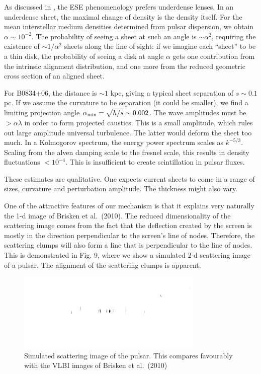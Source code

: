 \documentclass[useAMS,usenatbib]{mn2e}
\begin{document}
As discussed in \cite{2012MNRAS.421L.132P}, the ESE phenomenology
prefers underdense lenses.  In an underdense sheet, the maximal change
of density is the density itself.  For the mean interstellar medium
densities determined from pulsar dispersion, we obtain $\alpha \sim
10^{-2}$.  The probability of seeing a sheet at such an angle is $\sim
\alpha^2$, requiring the existence of $\sim 1/\alpha^2$ sheets along
the line of sight: if we imagine each ``sheet'' to be a thin disk, the
probability of seeing a disk at angle $\alpha$ gets one contribution
from the intrinsic alignment distribution, and one more from the
reduced geometric cross section of an aligned sheet.

For
B0834+06, the distance is $\sim 1$ kpc, giving a typical sheet
separation of $s \sim 0.1$ pc.  If we assume the curvature to be
separation (it could be smaller), we find a limiting projection angle
$\alpha_{\rm min} = \sqrt{h/s} \sim 0.002$.  The wave amplitudes must
be $> \alpha \lambda$ in order to form projected caustics.  This is a
small amplitude, which rules out large amplitude universal turbulence.
The latter would deform the sheet too much.  In a Kolmogorov spectrum,
the energy power spectrum scales as $k^{-5/3}$.  Scaling from the
alven damping scale to the fresnel scale, this results in density
fluctuations $< 10^{-4}$.  This is insufficient to create
scintillation in pulsar fluxes.

These estimates are qualitative.  One expects current sheets to come
in a range of sizes, curvature and perturbation amplitude.  The
thickness might also vary.%

One of the attractive features of our mechanism is that it explains very naturally the 1-d
image of Brisken et al.~(2010). The reduced dimensionality of the scattering image comes from the
fact that the deflection created by the screen is mostly in the direction perpendicular to the
screen's line of nodes. Therefore, the scattering clumps will also form a line that is perpendicular
to the line of nodes. This is demonstrated in Fig. 9, where we show a simulated 2-d scattering  image of
 a pulsar. The alignment of the scattering clumps is apparent.


\begin{figure}
\centerline{\includegraphics[width=3.5in]{image86r.png}}
\caption{Simulated scattering image of the pulsar.  This
  compares favourably with the VLBI images of Brisken et al.~(2010)
}
\label{fig:2d}
\end{figure}
\end{document}
